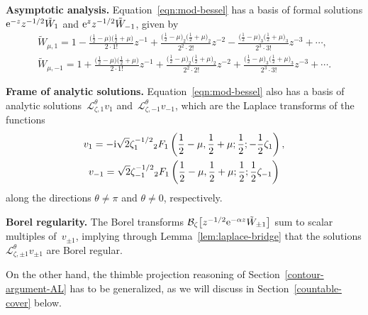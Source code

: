 \documentclass[pdftex]{sigma}
\newcommand{\series}[1]{\tilde{#1}}
\newcommand{\laplace}{\mathcal{L}}
\numberwithin{equation}{section}
\begin{document}
\textbf{Asymptotic analysis.}
Equation~\eqref{eqn:mod-bessel} has a basis of formal solutions ${\rm e}^{-z} z^{-1/2} \series{W}_1$ and $ {\rm e}^z z^{-1/2} \series{W}_{-1}$,
given by
\begin{gather*}
\series{W}_{\mu,1} = 1 - \frac{\bigl(\frac{1}{2}-\mu\bigr)\bigl(\frac{1}{2}+\mu\bigr)}{2 \cdot 1!} z^{-1} + \frac{\bigl(\frac{1}{2}-\mu\bigr)_2\bigl(\frac{1}{2}+\mu\bigr)_2}{2^2 \cdot 2!} z^{-2}
 - \frac{\bigl(\frac{1}{2}-\mu\bigr)_3\bigl(\frac{1}{2}+\mu\bigr)_3}{2^3 \cdot 3!} z^{-3} + \cdots, \\
\series{W}_{\mu,-1} = 1 + \frac{\bigl(\frac{1}{2}-\mu\bigr)\bigl(\frac{1}{2}+\mu\bigr)}{2 \cdot 1!} z^{-1} + \frac{\bigl(\frac{1}{2}-\mu\bigr)_2\bigl(\frac{1}{2}+\mu\bigr)_2}{2^2 \cdot 2!} z^{-2}
+ \frac{\bigl(\frac{1}{2}-\mu\bigr)_3\bigl(\frac{1}{2}+\mu\bigr)_3}{2^3 \cdot 3!} z^{-3} + \cdots.
\end{gather*}

\textbf{Frame of analytic solutions.}
Equation~\eqref{eqn:mod-bessel} also has a basis of analytic solutions~$\laplace^\theta_{\zeta, 1} v_1$ and~$\laplace^\theta_{\zeta, -1} v_{-1}$, which are the Laplace transforms of the functions
\begin{gather*}
v_1 = -{\rm i}\sqrt{2} \zeta_{1}^{-1/2} {}_2F_1\left(\frac{1}{2}-\mu, \frac{1}{2}+\mu; \frac{1}{2}; -\frac{1}{2}\zeta_{1}\right),\\
v_{-1} =\sqrt{2} \zeta_{-1}^{-1/2} {}_2F_1\left(\frac{1}{2}-\mu, \frac{1}{2}+\mu; \frac{1}{2}; \frac{1}{2}\zeta_{-1}\right)
\end{gather*}
along the directions $\theta \neq \pi$ and $\theta \neq 0$, respectively.

\textbf{Borel regularity.}
The Borel transforms $\mathcal{B}_\zeta\bigl[z^{-1/2} {\rm e}^{-\alpha z} \series{W}_{\pm 1}\bigr]$ sum to scalar multiples of~$v_{\pm 1}$, implying through Lemma~\ref{lem:laplace-bridge} that the solutions $\laplace^\theta_{\zeta, \pm 1} v_{\pm 1}$ are Borel regular.

On the other hand, the thimble projection reasoning of Section~\ref{contour-argument-AL} has to be generalized, as we will discuss in Section~\ref{countable-cover} below.
\end{document}
